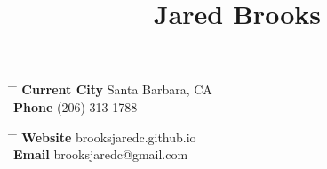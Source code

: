 \documentclass[10pt]{article} %
\begin{document}

\title{Jared Brooks} %


\parbox{0.5\textwidth}{ %
\begin{tabbing} %
\hspace{3cm} \= \hspace{4cm} \= \kill %
{\bf Current City} \> Santa Barbara, CA\\ %
{\bf Phone} \> (206) 313-1788 %
\end{tabbing}}
\hfill %
\parbox{0.5\textwidth}{ %
\begin{tabbing} %
\hspace{3cm} \= \hspace{4cm} \= \kill %
{\bf Website} \> brooksjaredc.github.io \\ %
{\bf Email} \> brooksjaredc@gmail.com %
\end{tabbing}}
\end{document}
